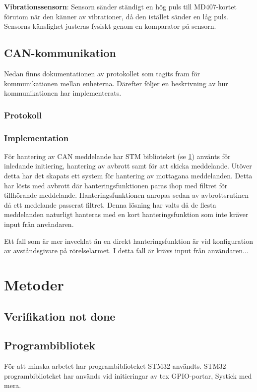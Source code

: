 \documentclass{article}
\begin{document}
\textbf{Vibrationssensorn}: Sensorn sänder ständigt en hög puls till MD407-kortet förutom när den känner av vibrationer, då den istället sänder en låg puls. 
Sensorns känslighet justeras fysiskt genom en komparator på sensorn.

\subsection{CAN-kommunikation}
\label{can}
Nedan finns dokumentationen av protokollet som tagits fram för
kommunikationen mellan enheterna. Därefter följer en beskrivning
av hur kommunikationen har implementerats.
\subsubsection{Protokoll}

\subsubsection{Implementation}
För hantering av CAN meddelande har STM biblioteket (se \ref{stm}) använts för inledande initiering, hantering av avbrott samt för att skicka meddelande.
Utöver detta har det skapats ett system för hantering av mottagana meddelanden.
Detta har lösts med avbrott där hanteringsfunktionen paras ihop med filtret för tillhörande meddelande.
Hanteringsfunktionen anropas sedan av avbrottsrutinen då ett medelande passerat filtret.
Denna lösning har valts då de flesta meddelanden naturligt hanteras med en kort hanteringsfunktion som inte kräver input från användaren.

Ett fall som är mer invecklat än en direkt hanteringsfunktion är vid konfiguration av avståndsgivare på rörelselarmet. I detta fall är krävs input från användaren... 





\section{Metoder}
\label{stm}
\subsection{Verifikation not done}
\subsection{Programbibliotek}
För att minska arbetet har programbiblioteket STM32\cite{stm}
användts.
STM32 programbiblioteket har används vid initieringar av tex GPIO-portar, Systick med mera.
\end{document}
